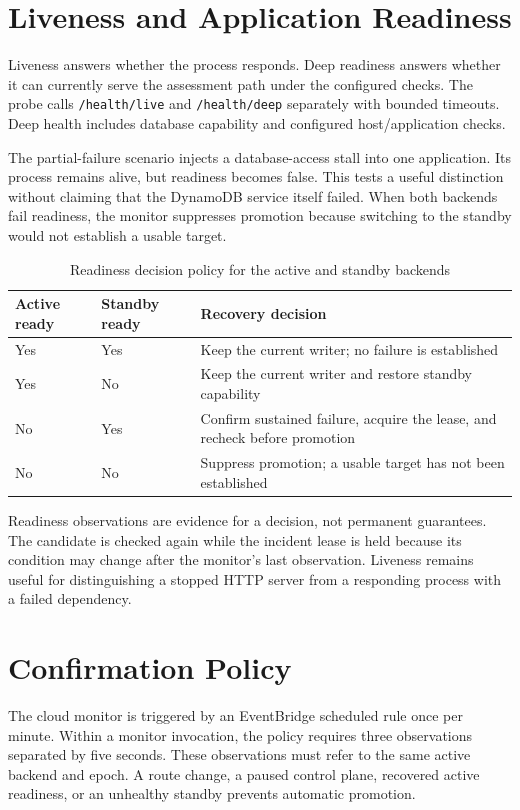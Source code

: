 \section{Liveness and Application Readiness}
Liveness answers whether the process responds. Deep readiness answers whether it can currently serve the assessment path under the configured checks. The probe calls \texttt{/health/live} and \texttt{/health/deep} separately with bounded timeouts. Deep health includes database capability and configured host/application checks.

The partial-failure scenario injects a database-access stall into one application. Its process remains alive, but readiness becomes false. This tests a useful distinction without claiming that the DynamoDB service itself failed. When both backends fail readiness, the monitor suppresses promotion because switching to the standby would not establish a usable target.

\begin{table}[!htbp]\centering\small
\caption{Readiness decision policy for the active and standby backends}\label{tab:health-decisions}
\begin{tabularx}{\textwidth}{@{}L{27mm}L{28mm}Y@{}}\toprule
\textbf{Active ready} & \textbf{Standby ready} & \textbf{Recovery decision}\\\midrule
Yes & Yes & Keep the current writer; no failure is established\\
Yes & No & Keep the current writer and restore standby capability\\
No & Yes & Confirm sustained failure, acquire the lease, and recheck before promotion\\
No & No & Suppress promotion; a usable target has not been established\\\bottomrule
\end{tabularx}\end{table}

Readiness observations are evidence for a decision, not permanent guarantees. The candidate is checked again while the incident lease is held because its condition may change after the monitor's last observation. Liveness remains useful for distinguishing a stopped HTTP server from a responding process with a failed dependency.
\section{Confirmation Policy}
The cloud monitor is triggered by an EventBridge scheduled rule once per minute. Within a monitor invocation, the policy requires three observations separated by five seconds. These observations must refer to the same active backend and epoch. A route change, a paused control plane, recovered active readiness, or an unhealthy standby prevents automatic promotion.

